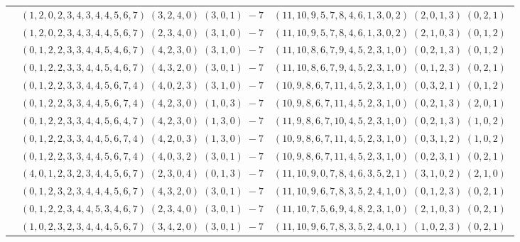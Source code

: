 \documentclass[11pt]{article}
\begin{document}
\begin{longtable}[l]{|c|c|c|}
 \cline{2-3} 
 & $(1 ,2 ,0 ,2 ,3 ,4 ,3 ,4 ,4 ,5 ,6 ,7) \;(3 ,2 ,4 ,0) \;(3 ,0 ,1) \;-7$ & $(11 ,10 ,9 ,5 ,7 ,8 ,4 ,6 ,1 ,3 ,0 ,2) \;(2 ,0 ,1 ,3) \;(0 ,2 ,1) \;$\\ 
 \cline{2-3} 
 & $(1 ,2 ,0 ,2 ,3 ,4 ,3 ,4 ,4 ,5 ,6 ,7) \;(2 ,3 ,4 ,0) \;(3 ,1 ,0) \;-7$ & $(11 ,10 ,9 ,5 ,7 ,8 ,4 ,6 ,1 ,3 ,0 ,2) \;(2 ,1 ,0 ,3) \;(0 ,1 ,2) \;$\\ 
 \cline{2-3} 
 & $(0 ,1 ,2 ,2 ,3 ,3 ,4 ,4 ,5 ,4 ,6 ,7) \;(4 ,2 ,3 ,0) \;(3 ,1 ,0) \;-7$ & $(11 ,10 ,8 ,6 ,7 ,9 ,4 ,5 ,2 ,3 ,1 ,0) \;(0 ,2 ,1 ,3) \;(0 ,1 ,2) \;$\\ 
 \cline{2-3} 
 & $(0 ,1 ,2 ,2 ,3 ,3 ,4 ,4 ,5 ,4 ,6 ,7) \;(4 ,3 ,2 ,0) \;(3 ,0 ,1) \;-7$ & $(11 ,10 ,8 ,6 ,7 ,9 ,4 ,5 ,2 ,3 ,1 ,0) \;(0 ,1 ,2 ,3) \;(0 ,2 ,1) \;$\\ 
 \cline{2-3} 
 & $(0 ,1 ,2 ,2 ,3 ,3 ,4 ,4 ,5 ,6 ,7 ,4) \;(4 ,0 ,2 ,3) \;(3 ,1 ,0) \;-7$ & $(10 ,9 ,8 ,6 ,7 ,11 ,4 ,5 ,2 ,3 ,1 ,0) \;(0 ,3 ,2 ,1) \;(0 ,1 ,2) \;$\\ 
 \cline{2-3} 
 & $(0 ,1 ,2 ,2 ,3 ,3 ,4 ,4 ,5 ,6 ,7 ,4) \;(4 ,2 ,3 ,0) \;(1 ,0 ,3) \;-7$ & $(10 ,9 ,8 ,6 ,7 ,11 ,4 ,5 ,2 ,3 ,1 ,0) \;(0 ,2 ,1 ,3) \;(2 ,0 ,1) \;$\\ 
 \cline{2-3} 
 & $(0 ,1 ,2 ,2 ,3 ,3 ,4 ,4 ,5 ,6 ,4 ,7) \;(4 ,2 ,3 ,0) \;(1 ,3 ,0) \;-7$ & $(11 ,9 ,8 ,6 ,7 ,10 ,4 ,5 ,2 ,3 ,1 ,0) \;(0 ,2 ,1 ,3) \;(1 ,0 ,2) \;$\\ 
 \cline{2-3} 
 & $(0 ,1 ,2 ,2 ,3 ,3 ,4 ,4 ,5 ,6 ,7 ,4) \;(4 ,2 ,0 ,3) \;(1 ,3 ,0) \;-7$ & $(10 ,9 ,8 ,6 ,7 ,11 ,4 ,5 ,2 ,3 ,1 ,0) \;(0 ,3 ,1 ,2) \;(1 ,0 ,2) \;$\\ 
 \cline{2-3} 
 & $(0 ,1 ,2 ,2 ,3 ,3 ,4 ,4 ,5 ,6 ,7 ,4) \;(4 ,0 ,3 ,2) \;(3 ,0 ,1) \;-7$ & $(10 ,9 ,8 ,6 ,7 ,11 ,4 ,5 ,2 ,3 ,1 ,0) \;(0 ,2 ,3 ,1) \;(0 ,2 ,1) \;$\\ 
 \cline{2-3} 
 & $(4 ,0 ,1 ,2 ,3 ,2 ,3 ,4 ,4 ,5 ,6 ,7) \;(2 ,3 ,0 ,4) \;(0 ,1 ,3) \;-7$ & $(11 ,10 ,9 ,0 ,7 ,8 ,4 ,6 ,3 ,5 ,2 ,1) \;(3 ,1 ,0 ,2) \;(2 ,1 ,0) \;$\\ 
 \cline{2-3} 
 & $(0 ,1 ,2 ,3 ,2 ,3 ,4 ,4 ,4 ,5 ,6 ,7) \;(4 ,3 ,2 ,0) \;(3 ,0 ,1) \;-7$ & $(11 ,10 ,9 ,6 ,7 ,8 ,3 ,5 ,2 ,4 ,1 ,0) \;(0 ,1 ,2 ,3) \;(0 ,2 ,1) \;$\\ 
 \cline{2-3} 
 & $(0 ,1 ,2 ,2 ,3 ,4 ,4 ,5 ,3 ,4 ,6 ,7) \;(2 ,3 ,4 ,0) \;(3 ,0 ,1) \;-7$ & $(11 ,10 ,7 ,5 ,6 ,9 ,4 ,8 ,2 ,3 ,1 ,0) \;(2 ,1 ,0 ,3) \;(0 ,2 ,1) \;$\\ 
 \cline{2-3} 
 & $(1 ,0 ,2 ,3 ,2 ,3 ,4 ,4 ,4 ,5 ,6 ,7) \;(3 ,4 ,2 ,0) \;(3 ,0 ,1) \;-7$ & $(11 ,10 ,9 ,6 ,7 ,8 ,3 ,5 ,2 ,4 ,0 ,1) \;(1 ,0 ,2 ,3) \;(0 ,2 ,1) \;$\\ 

\end{longtable}
\end{document}
